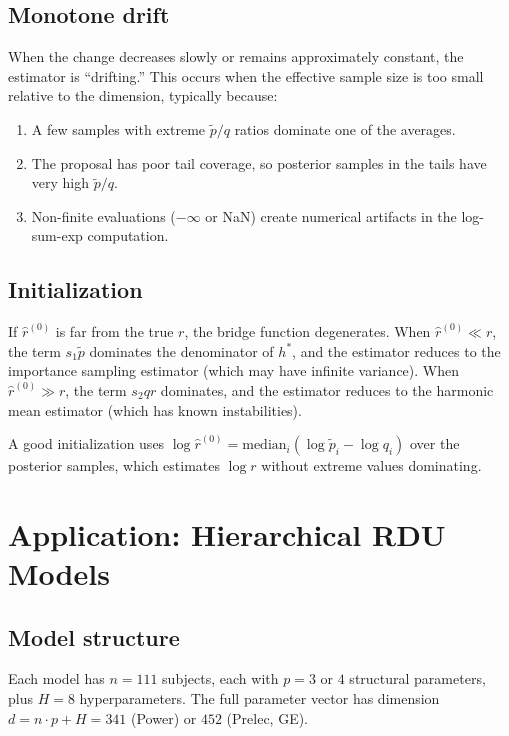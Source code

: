 \documentclass[11pt]{article}
\newcommand{\ptilde}{\tilde{p}}
\theoremstyle{plain}
\theoremstyle{definition}
\begin{document}
\subsection{Monotone drift}

When the change decreases slowly or remains approximately constant, the
estimator is ``drifting.'' This occurs when the effective sample size is too
small relative to the dimension, typically because:
\begin{enumerate}
  \item A few samples with extreme $\ptilde/q$ ratios dominate one of the
    averages.
  \item The proposal has poor tail coverage, so posterior samples in the tails
    have very high $\ptilde/q$.
  \item Non-finite evaluations ($-\infty$ or NaN) create numerical artifacts
    in the log-sum-exp computation.
\end{enumerate}

\subsection{Initialization}

If $\hat{r}^{(0)}$ is far from the true $r$, the bridge function
degenerates. When $\hat{r}^{(0)} \ll r$, the term
$s_1 \ptilde$ dominates the denominator of $h^*$, and the estimator
reduces to the importance sampling estimator (which may have infinite
variance). When $\hat{r}^{(0)} \gg r$, the term $s_2 q r$ dominates,
and the estimator reduces to the harmonic mean estimator (which has
known instabilities).

A good initialization uses
$\log \hat{r}^{(0)} = \text{median}_{i}(\log \ptilde_i - \log q_i)$
over the posterior samples, which estimates $\log r$ without extreme values
dominating.


\section{Application: Hierarchical RDU Models}

\subsection{Model structure}

Each model has $n = 111$ subjects, each with $p = 3$ or $4$ structural
parameters, plus $H = 8$ hyperparameters. The full parameter vector has
dimension $d = n \cdot p + H = 341$ (Power) or $452$ (Prelec, GE).
\end{document}

